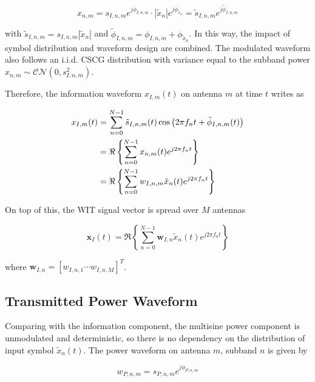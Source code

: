 \begin{equation}\label{eqn:modulated_symbol_further}
  {x_{n,m}} = {s_{I,n,m}}{e^{j{\phi _{I,n,m}}}} \cdot \left| {{{\tilde x}_n}} \right|{e^{j{\phi _{{{\tilde x}_n}}}}} = {{\tilde s}_{I,n,m}}{e^{j{{\tilde \phi }_{I,n,m}}}}
\end{equation}

with ${{\tilde s}_{I,n,m}} = {s_{I,n,m}}\left| {{{\tilde x}_n}} \right|$ and ${{\tilde \phi }_{I,n,m}} = {\phi _{I,n,m}} + {\phi _{{{\tilde x}_n}}}$. In this way, the impact of symbol distribution and waveform design are combined. The modulated waveform also follows an i.i.d. CSCG distribution with variance equal to the subband power ${x_{n,m}}\sim\mathcal{C}\mathcal{N}\left( {0,s_{I,n,m}^2} \right)$.

Therefore, the information waveform ${x_{I,m}}(t)$ on antenna $m$ at time $t$ writes as

\begin{align}\label{eqn:information_waveform}
  {x_{I,m}}(t) &= \sum\limits_{n = 0}^{N - 1} {{{\tilde s}_{I,n,m}}(t)\cos \left( {2\pi {f_n}t + {{\tilde \phi }_{I,n,m}}(t)} \right)}  \hfill \\
   &= \Re \left\{ {\sum\limits_{n = 0}^{N - 1} {{x_{n,m}}(t){e^{j2\pi {f_n}t}}} } \right\} \hfill \\
   &= \Re \left\{ {\sum\limits_{n = 0}^{N - 1} {{w_{I,n,m}}{{\tilde x}_n}(t){e^{j2\pi {f_n}t}}} } \right\} \hfill
\end{align}

On top of this, the WIT signal vector is spread over $M$ antennas

\begin{equation}\label{eqn:wit_vector}
  {{\mathbf{x}}_I}(t) = \Re \left\{ {\sum\limits_{n = 0}^{N - 1} {{{\mathbf{w}}_{I,n}}} {{\tilde x}_n}(t){e^{j2\pi {f_n}t}}} \right\}
\end{equation}

where ${{\mathbf{w}}_{I,n}} = {\left[ {{w_{I,n,1}} \cdots {w_{I,n,M}}} \right]^T}$.

\subsection{Transmitted Power Waveform}
Comparing with the information component, the multisine power component is unmodulated and deterministic, so there is no dependency on the distribution of input symbol $\tilde{x}_{n}(t)$. The power waveform on antenna $m$, subband $n$ is given by

\begin{equation}\label{eqn:unmodulated}
  {w_{P,n,m}} = {s_{P,n,m}}{e^{j{\phi _{P,n,m}}}}
\end{equation}


